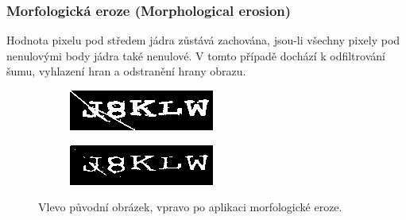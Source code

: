 \documentclass[
  field=ainfp,
  master=true,
  biblatex,
  sourcecodes=false,
  theorems=false,
  glossaries,
  index
]{kidiplom}
\begin{document}
\subsubsection*{Morfologická eroze (Morphological erosion)}
Hodnota pixelu pod středem jádra zůstává zachována, jsou-li všechny pixely pod nenulovými body jádra také nenulové. V tomto případě dochází k odfiltrování šumu, vyhlazení hran a odstranění hrany obrazu.
\begin{figure}[H]
\centering
\begin{subfigure}{.5\textwidth}
  \centering
  \includegraphics[width=.8\linewidth]{images/erosion_original.png}
\end{subfigure}%
\begin{subfigure}{.5\textwidth}
  \centering
  \includegraphics[width=.8\linewidth]{images/erosion_result.png}
\end{subfigure}
\caption{Vlevo původní obrázek, vpravo po aplikaci morfologické eroze.}
\label{fig:inverse_example}
\end{figure}
\end{document}
